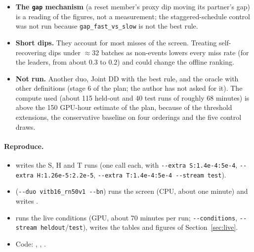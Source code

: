 \documentclass[10pt]{article}
\newcommand{\rl}[1]{\texttt{#1}}
\begin{document}
\begin{itemize}
  \item \textbf{The \rl{gap} mechanism} (a reset member's proxy dip moving its partner's gap) is a reading of the figures, not a measurement; the staggered-schedule control was not run because \rl{gap\_fast\_vs\_slow} is not the best rule.
  \item \textbf{Short dips.} They account for most misses of the screen. Treating self-recovering dips under $\approx 32$ batches as non-events lowers every miss rate (for the leaders, from about $0.3$ to $0.2$) and could change the offline ranking.
  \item \textbf{Not run.} Another duo, Joint DD with the best rule, and the oracle with other definitions (stage 6 of the plan; the author has not asked for it). The compute used (about 115 held-out and 40 test runs of roughly 68 minutes) is above the 150 GPU-hour estimate of the plan, because of the threshold extensions, the conservative baseline on four orderings and the five control draws.
\end{itemize}

\paragraph{Reproduce.}
\begin{itemize}
  \item {} writes the S, H and T runs (one call each, with \verb|--extra S:1.4e-4:5e-4|, \verb|--extra H:1.26e-5:2.2e-5|, \verb|--extra T:1.4e-4:5e-4 --stream test|).
  \item {} (\verb|--duo vitb16_rn50v1 --bn|) runs the screen (CPU, about one minute) and writes .
  \item {} runs the live conditions (GPU, about 70 minutes per run; \verb|--conditions|, \verb|--stream heldout|/\verb|test|),  writes the tables and figures of Section~\ref{sec:live}.
  \item Code: , , .
\end{itemize}
\end{document}
